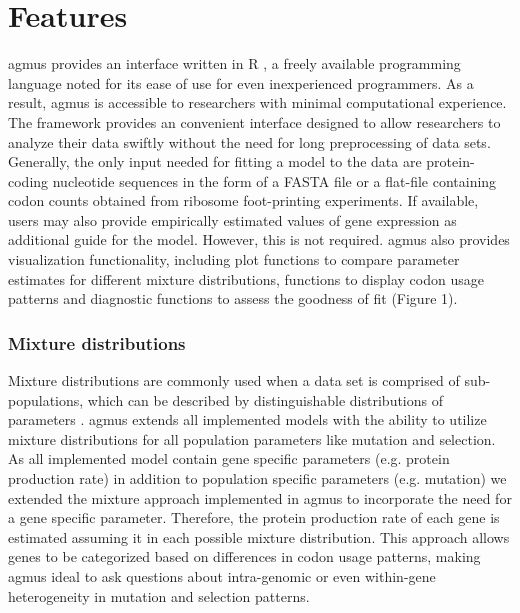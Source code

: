 \documentclass{bioinfo}
\newcommand{\package}{agmus } %
\begin{document}
\section*{Features}
\package provides an interface written in R \citep{rcore}, a freely available programming language noted for its ease of use for even inexperienced programmers. As a result, \package is accessible to researchers with minimal computational experience. The framework provides an convenient interface designed to allow researchers to analyze their data swiftly without the need for long preprocessing of data sets. Generally, the only input needed for fitting a model to the data are protein-coding nucleotide sequences in the form of a FASTA file or a flat-file containing codon counts obtained from ribosome foot-printing experiments. If available, users may also provide empirically estimated values of gene expression as additional guide for the model. However, this is not required.
\package also provides visualization functionality, including plot functions to compare parameter estimates for different mixture distributions, functions to display codon usage patterns and diagnostic functions to assess the goodness of fit (Figure 1).

\subsubsection*{Mixture distributions}
Mixture distributions are commonly used when a data set is comprised of sub-populations, which can be described by distinguishable distributions of parameters \citep{gelman2013}. \package extends all implemented models with the ability to utilize mixture distributions for all population parameters like mutation and selection. As all implemented model contain gene specific parameters (e.g. protein production rate) in addition to population specific parameters (e.g. mutation) we extended the mixture approach implemented in \package to incorporate the need for a gene specific parameter. Therefore, the protein production rate of each gene is estimated assuming it in each possible mixture distribution. This approach allows genes to be categorized based on differences in codon usage patterns, making \package ideal to ask questions about intra-genomic or even within-gene heterogeneity in mutation and selection patterns. 
\end{document}
